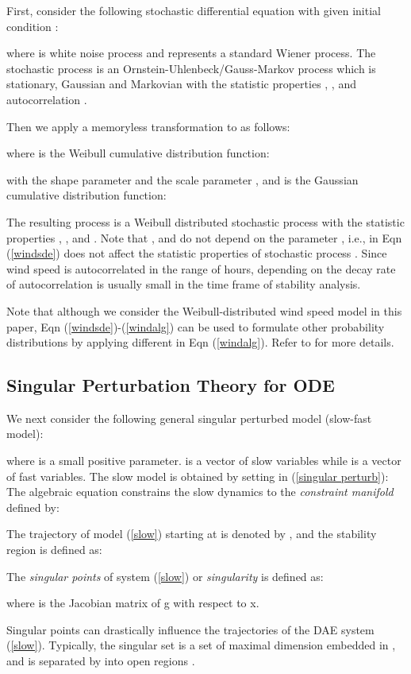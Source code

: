 \documentclass[journal]{IEEEtran}
\begin{document}
First, consider the following stochastic differential equation with given initial condition :

where  is white noise process and  represents a standard Wiener process. The stochastic process  is an Ornstein-Uhlenbeck/Gauss-Markov process which is stationary, Gaussian and Markovian with the statistic properties , , and autocorrelation .

Then we apply a memoryless transformation to  as follows:

where  is the Weibull cumulative distribution function:

with the shape parameter  and the scale parameter ,
and  is the Gaussian cumulative distribution function:

The resulting process  is a Weibull distributed stochastic process with the statistic properties , , and . Note that ,  and  do not depend on the parameter , i.e.,  in Eqn (\ref{windsde}) does not affect the statistic properties of stochastic process \cite{Milano:2013_1}. Since wind speed is autocorrelated in the range of hours,  depending on the decay rate of autocorrelation is usually small in the time frame of stability analysis.

Note that although we consider the Weibull-distributed wind speed model in this paper, Eqn (\ref{windsde})-(\ref{windalg}) can be used to formulate other probability distributions by applying different  in Eqn (\ref{windalg}). Refer to \cite{Milano:2013_1} for more details.

\subsection{Singular Perturbation Theory for ODE}
We next consider the following general singular perturbed model (slow-fast model):

where  is a small positive parameter.  is a vector of slow variables while  is a vector of fast variables. 
The slow model is obtained by setting  in (\ref{singular perturb}):
The algebraic equation  constrains the slow dynamics to the \textit{constraint manifold} defined by:

The trajectory of model (\ref{slow}) starting at  is denoted by , and the stability region is defined as:


The \textit{singular points} of system (\ref{slow}) or \textit{singularity } is defined as:

where  is the Jacobian matrix of g with respect to x.

Singular points can drastically influence the trajectories of the DAE system (\ref{slow}). Typically, the singular set  is a set of maximal dimension  embedded in , and  is separated by  into open regions \cite{Veukatasubramanian:article}\cite{Alberto:article}.
\end{document}
